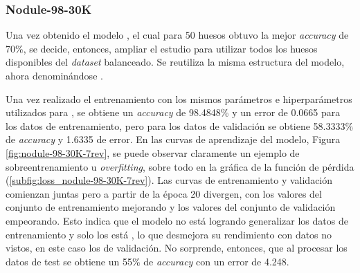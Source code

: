 \subsubsection{Nodule-98-30K}
Una vez obtenido el modelo , el cual para 50 huesos obtuvo la mejor \textit{accuracy} de 70\%, se decide, entonces, ampliar el estudio para utilizar todos los huesos disponibles del \textit{dataset} balanceado. Se reutiliza la misma estructura del modelo, ahora denominándose .

Una vez realizado el entrenamiento con los mismos parámetros e hiperparámetros utilizados para , se obtiene un \textit{accuracy} de 98.4848\% y un error de 0.0665 para los datos de entrenamiento, pero para los datos de validación se obtiene 58.3333\% de \textit{accuracy} y 1.6335 de error. En las curvas de aprendizaje del modelo, Figura \ref{fig:nodule-98-30K-7rev}, se puede observar claramente un ejemplo de sobreentrenamiento u \textit{overfitting}, sobre todo en la gráfica de la función de pérdida (\ref{subfig:loss_nodule-98-30K-7rev}). Las curvas de entrenamiento y validación comienzan juntas pero a partir de la época 20 divergen, con los valores del conjunto de entrenamiento mejorando y los valores del conjunto de validación empeorando. Esto indica que el modelo no está logrando generalizar los datos de entrenamiento y  solo los está , lo que desmejora su rendimiento con datos no vistos, en este caso los de validación. No sorprende, entonces, que al procesar los datos de test se obtiene un 55\% de \textit{accuracy} con un error de 4.248.


